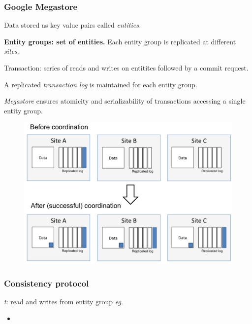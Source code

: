 \documentclass{beamer}
\begin{document}
\begin{frame}
    \frametitle{Google Megastore}
    \scriptsize
    Data stored as key value pairs called \emph{entities.}
    
    \medskip
    \textbf{Entity groups: set of entities.} Each entity group is replicated at different \emph{sites}.
        
    \medskip
    Transaction: series of reads and writes on entitites followed by a commit request.
    
    \bigskip
    A replicated \emph{transaction log} is maintained for each entity group.

    \bigskip
    \emph{Megastore} ensures atomicity and serializability of transactions accessing a single entity group.

    \begin{figure}
        \includegraphics[width=\textwidth, height=.5\textheight, keepaspectratio]{img/paxos.png}
    \end{figure}

\end{frame}
\begin{frame}
   \frametitle{Consistency protocol}
   \small
   \emph{t}: read and writes from entity group \emph{eg}.


    \begin{itemize}
        \item 
    \end{itemize}
\end{frame}
\end{document}
